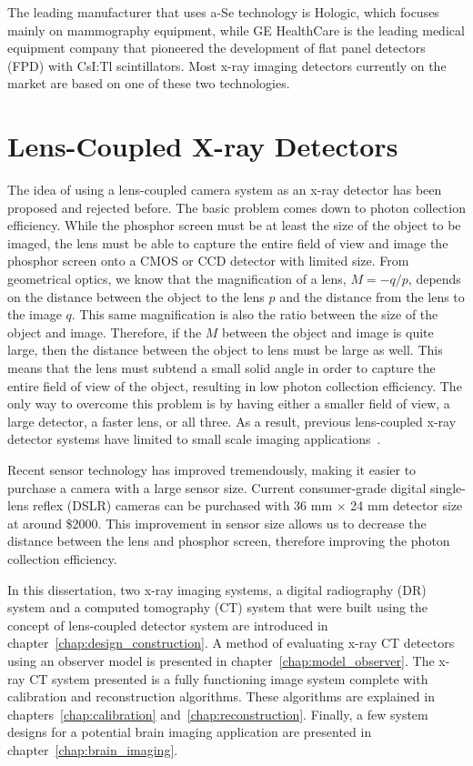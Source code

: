 The leading manufacturer that uses a-Se technology is Hologic, which focuses mainly on mammography equipment, while GE HealthCare is the leading medical equipment company that pioneered the development of flat panel detectors (FPD) with CsI:Tl scintillators.  Most x-ray imaging detectors currently on the market are based on one of these two technologies.  

\section{Lens-Coupled X-ray Detectors}
The idea of using a lens-coupled camera system as an x-ray detector has been proposed and rejected before.  The basic problem comes down to photon collection efficiency.  While the phosphor screen must be at least the size of the object to be imaged, the lens must be able to capture the entire field of view and image the phosphor screen onto a CMOS or CCD detector with limited size.  From geometrical optics, we know that the magnification of a lens, $M = -q/p$, depends on the distance between the object to the lens $p$ and the distance from the lens to the image $q$. This same magnification is also the ratio between the size of the object and image.  Therefore, if the $M$ between the object and image is quite large, then the distance between the object to lens must be large as well.  This means that the lens must subtend a small solid angle in order to capture the entire field of view of the object, resulting in low photon collection efficiency.  The only way to overcome this problem is by having either a smaller field of view, a large detector, a faster lens, or all three.  As a result, previous lens-coupled x-ray detector systems have limited to small scale imaging applications~\citep{lee2001, kim2005, tate2005, madden2006}.  

Recent sensor technology has improved tremendously, making it easier to purchase a camera with a large sensor size.  Current consumer-grade digital single-lens reflex (DSLR) cameras can be purchased with 36 mm $\times$ 24 mm detector size at around \$2000.  This improvement in sensor size allows us to decrease the distance between the lens and phosphor screen, therefore improving the photon collection efficiency.

In this dissertation, two x-ray imaging systems, a digital radiography (DR) system and a computed tomography (CT) system that were built using the concept of lens-coupled detector system are introduced in chapter~\ref{chap:design_construction}.  A method of evaluating x-ray CT detectors using an observer model is presented in chapter~\ref{chap:model_observer}.   The x-ray CT system presented is a fully functioning image system complete with calibration and reconstruction algorithms.  These algorithms are explained in chapters~\ref{chap:calibration} and~\ref{chap:reconstruction}.  Finally, a few system designs for a potential brain imaging application are presented in chapter~\ref{chap:brain_imaging}.  

